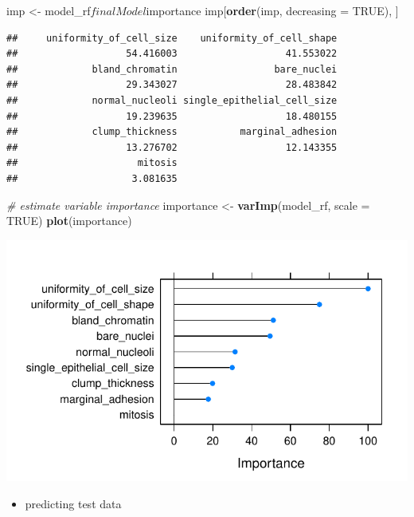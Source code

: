 \documentclass[]{article}
\newenvironment{Shaded}{\begin{snugshade}}{\end{snugshade}}
\newcommand{\KeywordTok}[1]{\textcolor[rgb]{0.13,0.29,0.53}{\textbf{{#1}}}}
\newcommand{\DataTypeTok}[1]{\textcolor[rgb]{0.13,0.29,0.53}{{#1}}}
\newcommand{\StringTok}[1]{\textcolor[rgb]{0.31,0.60,0.02}{{#1}}}
\newcommand{\CommentTok}[1]{\textcolor[rgb]{0.56,0.35,0.01}{\textit{{#1}}}}
\newcommand{\OtherTok}[1]{\textcolor[rgb]{0.56,0.35,0.01}{{#1}}}
\newcommand{\NormalTok}[1]{{#1}}
\providecommand{\tightlist}{%
  \setlength{\itemsep}{0pt}\setlength{\parskip}{0pt}}
\begin{document}
\begin{Shaded}
\begin{Highlighting}[]
\NormalTok{imp <-}\StringTok{ }\NormalTok{model_rf$finalModel$importance}
\NormalTok{imp[}\KeywordTok{order}\NormalTok{(imp, }\DataTypeTok{decreasing =} \OtherTok{TRUE}\NormalTok{), ]}
\end{Highlighting}
\end{Shaded}

\begin{verbatim}
##     uniformity_of_cell_size    uniformity_of_cell_shape 
##                   54.416003                   41.553022 
##             bland_chromatin                 bare_nuclei 
##                   29.343027                   28.483842 
##             normal_nucleoli single_epithelial_cell_size 
##                   19.239635                   18.480155 
##             clump_thickness           marginal_adhesion 
##                   13.276702                   12.143355 
##                     mitosis 
##                    3.081635
\end{verbatim}

\begin{Shaded}
\begin{Highlighting}[]
\CommentTok{# estimate variable importance}
\NormalTok{importance <-}\StringTok{ }\KeywordTok{varImp}\NormalTok{(model_rf, }\DataTypeTok{scale =} \OtherTok{TRUE}\NormalTok{)}
\KeywordTok{plot}\NormalTok{(importance)}
\end{Highlighting}
\end{Shaded}

\includegraphics{webinar_code_files/figure-latex/importance_rf-1.pdf}

\begin{itemize}
\tightlist
\item
  predicting test data
\end{itemize}
\end{document}
